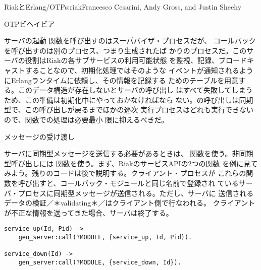 \begin{aosachapter}{RiakとErlang/OTP}{s:riak}{Francesco Cesarini, Andy Gross, and Justin Sheehy}
\begin{aosasect1}{OTPビヘイビア}
\begin{aosasect2}{サーバの起動}
関数を呼び出すのはスーパバイザ・プロセスだが、
コールバックを呼び出すのは別のプロセス、つまり生成されたば
かりのプロセスだ。このサーバの役割はRiakの各サブサービスの利用可能状態
を監視、記録、ブロードキャストすることなので、初期化処理ではそのような
イベントが通知されるようにErlangランタイムに依頼し、その情報を記録する
ためのテーブルを用意する。このデータ構造が存在しないとサーバの呼び出し
はすべて失敗してしまうため、この準備は初期化中にやっておかなければなら
ない。の呼び出しは同期型で、この呼び出しが戻るまでほかの逐次
実行プロセスはどれも実行できないので、関数での処理は必要最小
限に抑えるべきだ。

\end{aosasect2}

\begin{aosasect2}{メッセージの受け渡し}


サーバに同期型メッセージを送信する必要があるときは、
関数を使う。非同期型呼び出しには
関数を使う。まず、RiakのサービスAPIの2つの関数
を例に見てみよう。残りのコードは後で説明する。クライアント・プロセスが
これらの関数を呼び出すと、コールバック・モジュールと同じ名前で登録され
ているサーバ・プロセスに同期型メッセージが送信される。ただし、サーバに
送信されるデータの検証／＊validating＊／はクライアント側で行なわれる。
クライアントが不正な情報を送ってきた場合、サーバは終了する。

\begin{verbatim}
service_up(Id, Pid) ->
    gen_server:call(?MODULE, {service_up, Id, Pid}).

service_down(Id) ->
    gen_server:call(?MODULE, {service_down, Id}).
\end{verbatim}



\end{aosasect2}
\end{aosasect1}
\end{aosachapter}
